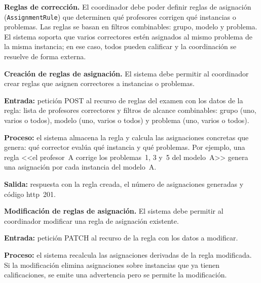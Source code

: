 
\item \textbf{Reglas de corrección.} \label{rf:assignment}
El coordinador debe poder definir reglas de asignación (\texttt{AssignmentRule}) que
determinen qué profesores corrigen qué instancias o problemas. Las reglas se basan en
filtros combinables: grupo, modelo y problema. El sistema soporta que varios correctores
estén asignados al mismo problema de la misma instancia; en ese caso, todos pueden
calificar y la coordinación se resuelve de forma externa.

\begin{functional}

    \item \textbf{Creación de reglas de asignación.} \label{rf:assignment:create}
    El sistema debe permitir al coordinador crear reglas que asignen correctores a
    instancias o problemas.

    \textbf{Entrada:} petición POST al recurso de reglas del examen con los datos de la
    regla: lista de profesores correctores y filtros de alcance combinables: grupo (uno,
    varios o todos), modelo (uno, varios o todos) y problema (uno, varios o todos).

    \textbf{Proceso:} el sistema almacena la regla y calcula las asignaciones concretas que
    genera: qué corrector evalúa qué instancia y qué problemas. Por ejemplo, una regla
    <<el profesor~A corrige los problemas~1, 3 y~5 del modelo~A>> genera una asignación
    por cada instancia del modelo~A.

    \textbf{Salida:} respuesta con la regla creada, el número de asignaciones generadas y
    código \acs{http}~201.

    \item \textbf{Modificación de reglas de asignación.} \label{rf:assignment:update}
    El sistema debe permitir al coordinador modificar una regla de asignación existente.

    \textbf{Entrada:} petición PATCH al recurso de la regla con los datos a modificar.

    \textbf{Proceso:} el sistema recalcula las asignaciones derivadas de la regla
    modificada. Si la modificación elimina asignaciones sobre instancias que ya tienen
    calificaciones, se emite una advertencia pero se permite la modificación.


\end{functional}
